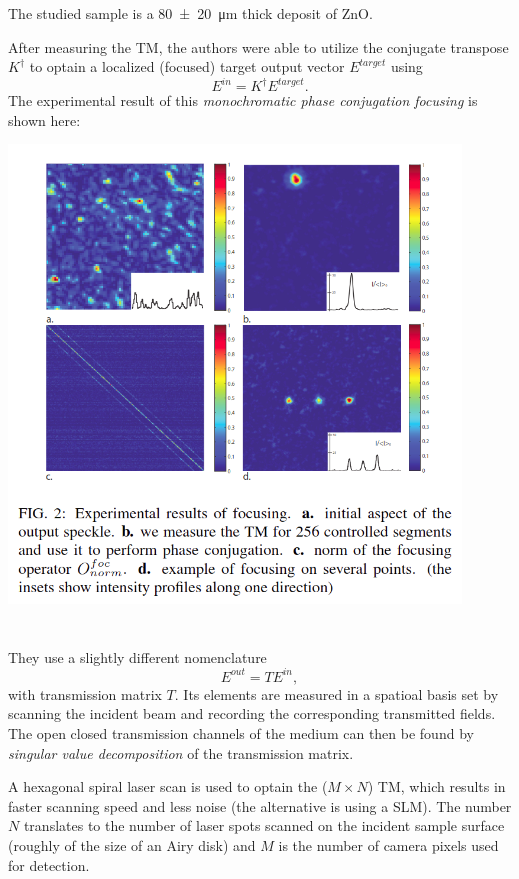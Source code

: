 \documentclass{article}
\begin{document}
The studied sample is a \SI{80+-20}{\micro m} thick deposit of ZnO.

After measuring the TM, the authors were able to utilize the conjugate transpose $K^\dagger$ to optain a localized (focused) target output vector $E^{target}$ using
\begin{equation}
    E^{in}=K^\dagger E^{target}.
\end{equation}
The experimental result of this \textit{monochromatic phase conjugation focusing} is shown here:

\noindent\includegraphics[width=0.9\textwidth]{figures/TM_conjugate.png}

\section{\cite{Pai_Bosch_Mosk_2018} }

They use a slightly different nomenclature
\begin{equation}
    E^{out}=T E^{in},
\end{equation}
with transmission matrix $T$. Its elements are measured in a spatioal basis set by scanning the incident beam and recording the corresponding transmitted fields. The open closed transmission channels of the medium can then be found by \textit{singular value decomposition}  of the transmission matrix. 

A hexagonal spiral laser scan is used to optain the ($M \times N$) TM, which results in faster scanning speed and less noise (the alternative is using a SLM). The number $N$ translates to the number of laser spots scanned on the incident sample surface (roughly of the size of an Airy disk) and $M$ is the number of camera pixels used for detection.
\end{document}
